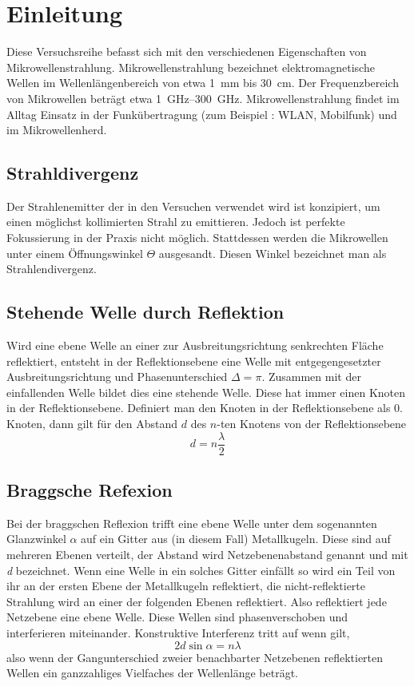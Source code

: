 \section{Einleitung}
Diese Versuchsreihe befasst sich mit den verschiedenen Eigenschaften von Mikrowellenstrahlung. Mikrowellenstrahlung bezeichnet elektromagnetische Wellen im Wellenlängenbereich von etwa \SI{1}{\milli\meter} bis \SI{30}{\centi\meter}. Der Frequenzbereich von Mikrowellen beträgt etwa \SIrange{1}{300}{\giga\hertz}. Mikrowellenstrahlung findet im Alltag Einsatz in der Funkübertragung (zum Beispiel : WLAN, Mobilfunk) und im Mikrowellenherd.
\subsection{Strahldivergenz}
Der Strahlenemitter der in den Versuchen verwendet wird ist konzipiert, um einen möglichst kollimierten Strahl zu emittieren. Jedoch ist perfekte Fokussierung in der Praxis nicht möglich. Stattdessen werden die Mikrowellen unter einem Öffnungswinkel $ \Theta $ ausgesandt. Diesen Winkel bezeichnet man als Strahlendivergenz.
\subsection{Stehende Welle durch Reflektion}
Wird eine ebene Welle an einer zur Ausbreitungsrichtung senkrechten Fläche reflektiert, entsteht in der Reflektionsebene eine Welle mit entgegengesetzter Ausbreitungsrichtung und Phasenunterschied $ \Delta = \pi $. Zusammen mit der einfallenden Welle bildet dies eine stehende Welle. Diese hat immer einen Knoten in der Reflektionsebene. Definiert man den Knoten in der Reflektionsebene als 0. Knoten, dann gilt für den Abstand $ d $ des $ n $-ten Knotens von der Reflektionsebene
\begin{equation}
	d = n \frac{\lambda}{2}
\end{equation}
\subsection{Braggsche Refexion}
Bei der braggschen Reflexion trifft eine ebene Welle unter dem sogenannten Glanzwinkel $ \alpha $ auf ein Gitter aus (in diesem Fall) Metallkugeln. Diese sind auf mehreren Ebenen verteilt, der Abstand wird Netzebenenabstand genannt und mit \textit{d} bezeichnet.
Wenn eine Welle in ein solches Gitter einfällt so wird ein Teil von ihr an der ersten Ebene der Metallkugeln reflektiert, die nicht-reflektierte Strahlung wird an einer der folgenden Ebenen reflektiert. Also reflektiert jede Netzebene eine ebene Welle. Diese Wellen sind phasenverschoben und interferieren miteinander. Konstruktive Interferenz tritt auf wenn gilt,
\begin{equation}
2\textit{d}\sin \alpha=n\lambda
\end{equation}
also wenn der Gangunterschied zweier benachbarter Netzebenen reflektierten Wellen ein ganzzahliges Vielfaches der Wellenlänge beträgt.
